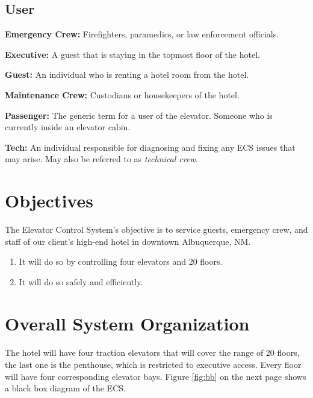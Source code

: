 \documentclass[12pt]{article}
\begin{document}
\subsection{User}
\begin{list}{•}{•}
	\item \textbf{Emergency Crew:} Firefighters, paramedics, or law enforcement officials.
	\item \textbf{Executive:} A guest that is staying in the topmost floor of the hotel.
	\item \textbf{Guest:} An individual who is renting a hotel room from the hotel.
	\item \textbf{Maintenance Crew:} Custodians or housekeepers of the hotel.
	\item \textbf{Passenger:} The generic term for a user of the elevator. Someone who is currently 
	inside an elevator cabin.
	\item \textbf{Tech:} An individual responsible for diagnosing and fixing any ECS issues that may 
	arise. May also be referred to as \textit{technical crew}.
\end{list}

\section{Objectives} %
\label{obj}
The Elevator Control System’s objective is to service guests, emergency crew, and staff of our client’s high-end hotel in downtown Albuquerque, NM.
\begin{enumerate}
	\item It will do so by controlling four elevators and 20 floors.
	\item It will do so safely and efficiently.
\end{enumerate}
\section{Overall System Organization} %
\label{sys}
\paragraph{} The hotel will have four traction elevators that will cover the range of 20 floors, the last one is the penthouse, which is restricted to executive access. Every floor will have four corresponding elevator bays. Figure \ref{fig:bb} on the next page shows a black box diagram of the ECS.
\end{document}
